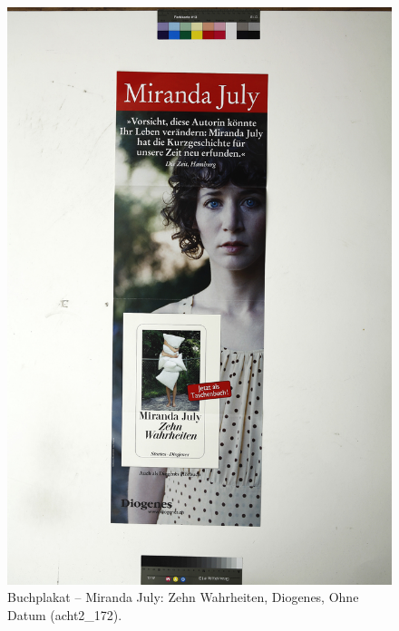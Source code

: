 \documentclass[a4paper,12pt,ngerman]{article}
\begin{document}
\newpage
\begin{figure}[ht]
\includegraphics[width=\linewidth]{Abbildung_13_(acht2_172)}
\centering
\caption{Buchplakat -- Miranda July: Zehn Wahrheiten, Diogenes, Ohne Datum (acht2\_172).}
\end{figure}
\end{document}
